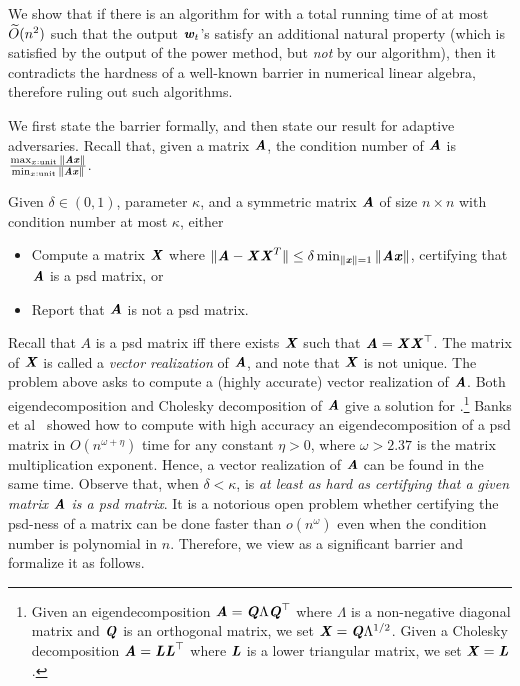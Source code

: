  We show that if there is an algorithm for  with a total running time of at most $\Otil(n^2)$ such that the output $\ww_t$'s satisfy an additional natural property (which is satisfied by the output of the power method, but \emph{not} by our algorithm), then it contradicts the hardness of a well-known barrier in numerical linear algebra, therefore ruling out such algorithms.
 
 We first state the barrier formally, and then state our result for adaptive adversaries.
Recall that, given a matrix $\AA$, the condition number of $\AA$ is $\frac{\max_{x:\textrm{unit}}\|\AA\xx\|}{\min_{x:\textrm{unit}}\|\AA\xx\|}$.

\begin{problem}\label{prob:factor}Given $\delta\in(0,1)$, parameter $\kappa$, and a symmetric matrix $\AA$ of size $n\times n$ with condition number at most $\kappa$, either 
	\begin{itemize}
		\item Compute a matrix $\XX$ where $\|\AA-\XX\XX^{T}\|\le\delta\min_{\|\xx\|=1}\|\AA\xx\|$, certifying that $\AA$ is a psd matrix, or
		\item Report that $\AA$ is not a psd matrix.
	\end{itemize}
\end{problem}

Recall that $A$ is a psd matrix iff there exists $\XX$ such that $\AA=\XX\XX^{\top}$. The matrix of $\XX$ is called a \emph{vector realization} of $\AA$, and note that $\XX$ is not unique. The problem above asks to compute a (highly accurate) vector realization of $\AA$. Both eigendecomposition and Cholesky decomposition of $\AA$ give a solution for .\footnote{Given an eigendecomposition $\AA=\QQ\Lambda \QQ^{\top}$ where $\Lambda$ is a non-negative diagonal matrix and $\QQ$ is an orthogonal matrix, we set $\XX=\QQ\Lambda^{1/2}$. Given a Cholesky decomposition $\AA=\LL\LL^{\top}$ where $\LL$ is a lower triangular matrix, we set $\XX=\LL$.} Banks et al~\cite{banks2022pseudospectral} showed how to compute with high accuracy an eigendecomposition of a psd matrix in $O(n^{\omega+\eta})$ time for any constant $\eta>0$, where $\omega > 2.37$ is the matrix multiplication exponent. Hence, a vector realization of $\AA$ can be found in the same time. Observe that, when $\delta < \kappa$,  is \emph{at least as hard as certifying that a given matrix $\AA$ is a psd matrix}.
It is a notorious open problem whether certifying the psd-ness of a matrix can be done faster than $o(n^\omega)$ even when the condition number is polynomial in $n$.
Therefore, we view  as a significant barrier and formalize it as follows.%



